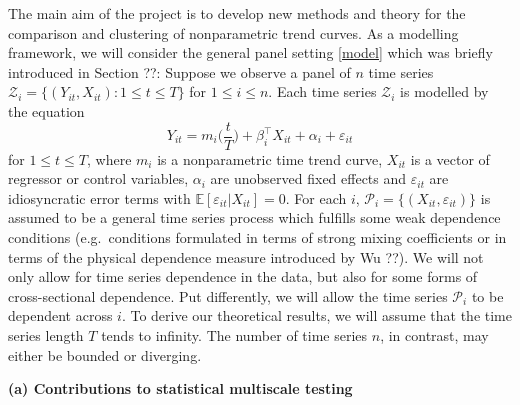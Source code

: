 \documentclass[a4paper,12pt]{article}
\begin{document}
The main aim of the project is to develop new methods and theory for the comparison and clustering of nonparametric trend curves. As a modelling framework, we will consider the general panel setting \eqref{model} which was briefly introduced in Section ??:  Suppose we observe a panel of $n$ time series $\mathcal{Z}_i = \{(Y_{it},X_{it}): 1 \le t \le T\}$ for $ 1 \le i \le n$. Each time series $\mathcal{Z}_i$ is modelled by the equation 
\begin{equation}\label{model-objectives}
Y_{it} = m_i \Big( \frac{t}{T} \Big) + \beta_i^\top X_{it} + \alpha_i + \varepsilon_{it} 
\end{equation}
for $ 1 \le t \le T$, where $m_i$ is a nonparametric time trend curve, $X_{it}$ is a vector of regressor or control variables, $\alpha_i$ are unobserved fixed effects and $\varepsilon_{it}$ are idiosyncratic error terms with $\mathbb{E}[\varepsilon_{it}|X_{it} ] = 0$. For each $i$, $\mathcal{P}_i = \{(X_{it},\varepsilon_{it})\}$ is assumed to be a general time series process which fulfills some weak dependence conditions (e.g.\ conditions formulated in terms of strong mixing coefficients or in terms of the physical dependence measure introduced by Wu ??). We will not only allow for time series dependence in the data, but also for some forms of cross-sectional dependence. Put differently, we will allow the time series $\mathcal{P}_i$ to be dependent across $i$. To derive our theoretical results, we will assume that the time series length $T$ tends to infinity. The number of time series $n$, in contrast, may either be bounded or diverging. 
\vspace{15pt}


\noindent \textbf{(a) Contributions to statistical multiscale testing} 
\vspace{10pt} 
\end{document}
